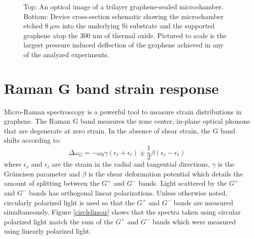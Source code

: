 \begin{figure}
\begin{center}
\end{center}
\caption{\label{fig:fri:device} Top: An optical image of a trilayer graphene-sealed microchamber. Bottom: Device cross-section schematic showing the microchamber etched $8 \ \mu m$ into the underlying Si substrate and the supported graphene atop the 300 nm of thermal oxide.  Pictured to scale is the largest pressure induced deflection of the graphene achieved in any of the analyzed experiments.}
\end{figure}

\section{Raman G band strain response}
Micro-Raman spectroscopy is a powerful tool to measure strain distributions in graphene.
The Raman G band measures the zone center, in-plane optical phonons that are degenerate at zero strain.
In the absence of shear strain, the G band shifts according to\cite{Huang2009}:
\begin{equation}
\Delta \omega_G=-\omega_0 \gamma(\epsilon_{r}+\epsilon_{t}) \pm \frac{1}{2} \beta (\epsilon_{r}-\epsilon_{t})
\end{equation}
where $\epsilon_{r}$ and $\epsilon_{t}$ are the strain in the radial and tangential directions,  $\gamma$ is the Gr\"{u}neisen parameter and $\beta$ is the shear deformation potential which details the amount of splitting between the $G^+$ and $G^-$ bands.  Light scattered by the $G^+$ and $G^-$  bands has orthogonal linear polarizations\cite{Huang2009}.  Unless otherwise noted, circularly polarized light is used so that the $G^+$ and $G^-$ bands are measured simultaneously.  Figure \ref{circlelinear} shows that the spectra taken using circular polarized light match the sum of the $G^+$ and $G^-$ bands which were measured using linearly polarized light.

